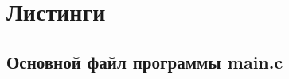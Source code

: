 \documentclass[12pt,a4paper]{report}
\begin{document}
\section*{Листинги}
\subsection*{Основной файл программы main.c}
%
%
\end{document}
